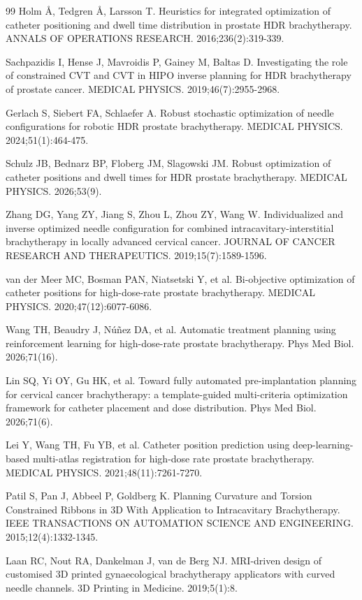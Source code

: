 \documentclass[12pt,twoside,letterpaper]{article}
\begin{document}
\begin{thebibliography}{99}
 Holm Å, Tedgren Å, Larsson T. Heuristics for integrated optimization of catheter positioning and dwell time distribution in prostate HDR brachytherapy. ANNALS OF OPERATIONS RESEARCH. 2016;236(2):319-339.

 Sachpazidis I, Hense J, Mavroidis P, Gainey M, Baltas D. Investigating the role of constrained CVT and CVT in HIPO inverse planning for HDR brachytherapy of prostate cancer. MEDICAL PHYSICS. 2019;46(7):2955-2968.

 Gerlach S, Siebert FA, Schlaefer A. Robust stochastic optimization of needle configurations for robotic HDR prostate brachytherapy. MEDICAL PHYSICS. 2024;51(1):464-475.

 Schulz JB, Bednarz BP, Floberg JM, Slagowski JM. Robust optimization of catheter positions and dwell times for HDR prostate brachytherapy. MEDICAL PHYSICS. 2026;53(9).

 Zhang DG, Yang ZY, Jiang S, Zhou L, Zhou ZY, Wang W. Individualized and inverse optimized needle configuration for combined intracavitary-interstitial brachytherapy in locally advanced cervical cancer. JOURNAL OF CANCER RESEARCH AND THERAPEUTICS. 2019;15(7):1589-1596.

 van der Meer MC, Bosman PAN, Niatsetski Y, et al. Bi-objective optimization of catheter positions for high-dose-rate prostate brachytherapy. MEDICAL PHYSICS. 2020;47(12):6077-6086.

 Wang TH, Beaudry J, Núñez DA, et al. Automatic treatment planning using reinforcement learning for high-dose-rate prostate brachytherapy. Phys Med Biol. 2026;71(16).

 Lin SQ, Yi OY, Gu HK, et al. Toward fully automated pre-implantation planning for cervical cancer brachytherapy: a template-guided multi-criteria optimization framework for catheter placement and dose distribution. Phys Med Biol. 2026;71(6).

 Lei Y, Wang TH, Fu YB, et al. Catheter position prediction using deep-learning-based multi-atlas registration for high-dose rate prostate brachytherapy. MEDICAL PHYSICS. 2021;48(11):7261-7270.

 Patil S, Pan J, Abbeel P, Goldberg K. Planning Curvature and Torsion Constrained Ribbons in 3D With Application to Intracavitary Brachytherapy. IEEE TRANSACTIONS ON AUTOMATION SCIENCE AND ENGINEERING. 2015;12(4):1332-1345.

 Laan RC, Nout RA, Dankelman J, van de Berg NJ. MRI-driven design of customised 3D printed gynaecological brachytherapy applicators with curved needle channels. 3D Printing in Medicine. 2019;5(1):8.


\end{thebibliography}
\end{document}
